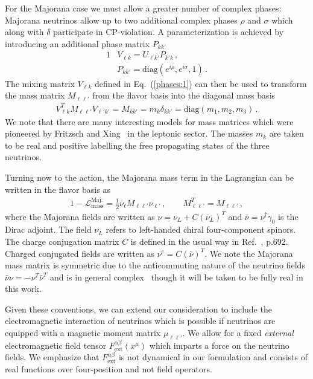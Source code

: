 \documentclass{ws-ijmpa}
\newcommand{\req}[1]{Eq.~(\ref{#1})}
\begin{document}
For the Majorana case we must allow a greater number of complex phases: Majorana neutrinos allow up to two additional complex phases $\rho$ and $\sigma$ which along with $\delta$ participate in CP-violation. A parameterization is achieved by introducing an additional phase matrix $P_{kk'}$
\begin{alignat}{1}
\label{phases:1} &V_{\ell k} = U_{\ell k'}P_{k'k}\,,\\
\label{phases:3} &P_{kk'} = \mathrm{diag}(e^{i\rho},e^{i\sigma},1)\,.
\end{alignat}
The mixing matrix $V_{\ell k}$ defined in \req{phases:1} can then be used to transform the mass matrix $M_{\ell\ell'}$ from the flavor basis into the diagonal mass basis 
\begin{align}
\label{diag:1}
V_{\ell k}^{T}M_{\ell\ell'}V_{\ell'k'} = M_{kk'} = m_{k}\delta_{kk'} = \mathrm{diag}(m_{1},m_{2},m_{3})\,.
\end{align}
We note that there are many interesting models for mass matrices which were pioneered by Fritzsch and Xing~\cite{Fritzsch:1995dj,Fritzsch:1998xs,Fritzsch:1999ee,Xing:2000ik} in the leptonic sector. The masses $m_{k}$ are taken to be real and positive labelling the free propagating states of the three neutrinos.

Turning now to the action, the Majorana mass term in the Lagrangian can be written in the flavor basis as
\begin{alignat}{1}
\label{mass:1} -\mathcal{L}_{\mathrm{mass}}^{\mathrm{Maj.}}=\frac{1}{2}\bar\nu_{\ell}M_{\ell\ell'}\nu_{\ell'}\,,\qquad
M_{\ell\ell'}^{T}=M_{\ell\ell'}\,,
\end{alignat}
where the Majorana fields are written as $\nu=\nu_{L}+C(\bar\nu_{L})^{T}$ and $\bar\nu=\nu^{\dag}\gamma_{0}$ is the Dirac adjoint. The field $\nu_{L}$ refers to left-handed chiral four-component spinors. The charge conjugation matrix $C$ is defined in the usual way in Ref.~, p.692. Charged conjugated fields are written as $\nu^{c}=C(\bar\nu)^{T}$. We note the Majorana mass matrix is symmetric due to the anticommuting nature of the neutrino fields $\bar\nu\nu=-\nu^{T}\bar\nu^{T}$ and is in general complex~\cite{Adhikary:2013bma,giunti2007fundamentals} though it will be taken to be fully real in this work.

Given these conventions, we can extend our consideration to include the electromagnetic interaction of neutrinos which is possible if neutrinos are equipped with a magnetic moment matrix $\mu_{\ell\ell'}$. We allow for a fixed \emph{external} electromagnetic field tensor $F^{\alpha\beta}_\mathrm{ext}(x^{\mu})$ which imparts a force on the neutrino fields. We emphasize that $F^{\alpha\beta}_\mathrm{ext}$ is not dynamical in our formulation and consists of real functions over four-position and not field operators.
\end{document}
